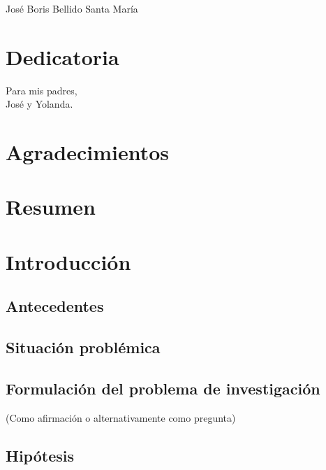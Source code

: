 \documentclass[12pt,letterpaper,titlepage,oneside]{book}
\begin{document}
\begin{center}
José Boris Bellido Santa María
\end{center} 

\chapter*{Dedicatoria}
\begin{center}
Para mis padres, \\
José y Yolanda.
\end{center} 

\chapter*{Agradecimientos}

\tableofcontents
{}
\listoftables
{}
\listoffigures
{}

\chapter*{Resumen}
\frontmatter

\mainmatter

\chapter*{Introducción}
\section*{Antecedentes}

\section*{Situación problémica}

\section*{Formulación del problema de investigación}
 (Como afirmación  o alternativamente como  pregunta)

\section*{Hipótesis}
\end{document}
